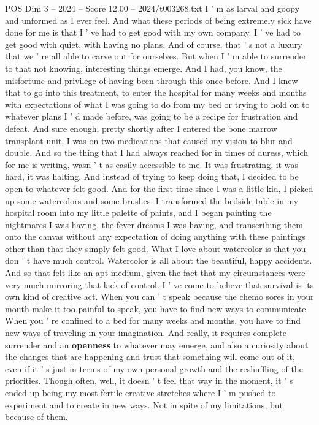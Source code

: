 \begin{textsample}{POS Dim 3 – 2024 – Score 12.00 – 2024/t003268.txt}
I ' m as larval and goopy and unformed as I ever feel.
And what these periods of being extremely sick have done for me is that I ' ve had to get good with my own company.
I ' ve had to get good with quiet, with having no plans.
And of course, that ' s not a luxury that we ' re all able to carve out for ourselves.
But when I ' m able to surrender to that not knowing, interesting things emerge.
And I had, you know, the misfortune and privilege of having been through this once before.
And I knew that to go into this treatment, to enter the hospital for many weeks and months with expectations of what I was going to do from my bed or trying to hold on to whatever plans I ' d made before, was going to be a recipe for frustration and defeat.
And sure enough, pretty shortly after I entered the bone marrow transplant unit, I was on two medications that caused my vision to blur and double.
And so the thing that I had always reached for in times of duress, which for me is writing, wasn ' t as easily accessible to me.
It was frustrating, it was hard, it was halting.
And instead of trying to keep doing that, I decided to be open to whatever felt good.
And for the first time since I was a little kid, I picked up some watercolors and some brushes.
I transformed the bedside table in my hospital room into my little palette of paints, and I began painting the nightmares I was having, the fever dreams I was having, and transcribing them onto the canvas without any expectation of doing anything with these paintings other than that they simply felt good.
What I love about watercolor is that you don ' t have much control.
Watercolor is all about the beautiful, happy accidents.
And so that felt like an apt medium, given the fact that my circumstances were very much mirroring that lack of control.
I ' ve come to believe that survival is its own kind of creative act.
When you can ' t speak because the chemo sores in your mouth make it too painful to speak, you have to find new ways to communicate.
When you ' re confined to a bed for many weeks and months, you have to find new ways of traveling in your imagination.
And really, it requires complete surrender and an \textbf{openness} to whatever may emerge, and also a curiosity about the changes that are happening and trust that something will come out of it, even if it ' s just in terms of my own personal growth and the reshuffling of the priorities.
Though often, well, it doesn ' t feel that way in the moment, it ' s ended up being my most fertile creative stretches where I ' m pushed to experiment and to create in new ways.
Not in spite of my limitations, but because of them.

\end{textsample}
